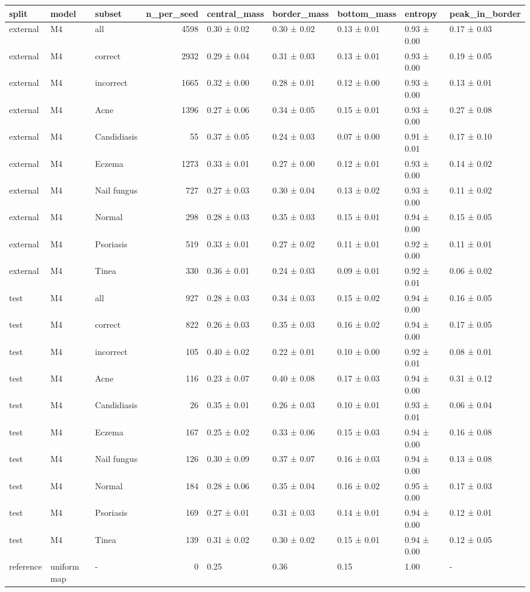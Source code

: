 \begin{tabular}{lllrlllll}
\toprule
split & model & subset & n\_per\_seed & central\_mass & border\_mass & bottom\_mass & entropy & peak\_in\_border \\
\midrule
external & M4 & all & 4598 & 0.30 ± 0.02 & 0.30 ± 0.02 & 0.13 ± 0.01 & 0.93 ± 0.00 & 0.17 ± 0.03 \\
external & M4 & correct & 2932 & 0.29 ± 0.04 & 0.31 ± 0.03 & 0.13 ± 0.01 & 0.93 ± 0.00 & 0.19 ± 0.05 \\
external & M4 & incorrect & 1665 & 0.32 ± 0.00 & 0.28 ± 0.01 & 0.12 ± 0.00 & 0.93 ± 0.00 & 0.13 ± 0.01 \\
external & M4 & Acne & 1396 & 0.27 ± 0.06 & 0.34 ± 0.05 & 0.15 ± 0.01 & 0.93 ± 0.00 & 0.27 ± 0.08 \\
external & M4 & Candidiasis & 55 & 0.37 ± 0.05 & 0.24 ± 0.03 & 0.07 ± 0.00 & 0.91 ± 0.01 & 0.17 ± 0.10 \\
external & M4 & Eczema & 1273 & 0.33 ± 0.01 & 0.27 ± 0.00 & 0.12 ± 0.01 & 0.93 ± 0.00 & 0.14 ± 0.02 \\
external & M4 & Nail fungus & 727 & 0.27 ± 0.03 & 0.30 ± 0.04 & 0.13 ± 0.02 & 0.93 ± 0.00 & 0.11 ± 0.02 \\
external & M4 & Normal & 298 & 0.28 ± 0.03 & 0.35 ± 0.03 & 0.15 ± 0.01 & 0.94 ± 0.00 & 0.15 ± 0.05 \\
external & M4 & Psoriasis & 519 & 0.33 ± 0.01 & 0.27 ± 0.02 & 0.11 ± 0.01 & 0.92 ± 0.00 & 0.11 ± 0.01 \\
external & M4 & Tinea & 330 & 0.36 ± 0.01 & 0.24 ± 0.03 & 0.09 ± 0.01 & 0.92 ± 0.01 & 0.06 ± 0.02 \\
test & M4 & all & 927 & 0.28 ± 0.03 & 0.34 ± 0.03 & 0.15 ± 0.02 & 0.94 ± 0.00 & 0.16 ± 0.05 \\
test & M4 & correct & 822 & 0.26 ± 0.03 & 0.35 ± 0.03 & 0.16 ± 0.02 & 0.94 ± 0.00 & 0.17 ± 0.05 \\
test & M4 & incorrect & 105 & 0.40 ± 0.02 & 0.22 ± 0.01 & 0.10 ± 0.00 & 0.92 ± 0.01 & 0.08 ± 0.01 \\
test & M4 & Acne & 116 & 0.23 ± 0.07 & 0.40 ± 0.08 & 0.17 ± 0.03 & 0.94 ± 0.00 & 0.31 ± 0.12 \\
test & M4 & Candidiasis & 26 & 0.35 ± 0.01 & 0.26 ± 0.03 & 0.10 ± 0.01 & 0.93 ± 0.01 & 0.06 ± 0.04 \\
test & M4 & Eczema & 167 & 0.25 ± 0.02 & 0.33 ± 0.06 & 0.15 ± 0.03 & 0.94 ± 0.00 & 0.16 ± 0.08 \\
test & M4 & Nail fungus & 126 & 0.30 ± 0.09 & 0.37 ± 0.07 & 0.16 ± 0.03 & 0.94 ± 0.00 & 0.13 ± 0.08 \\
test & M4 & Normal & 184 & 0.28 ± 0.06 & 0.35 ± 0.04 & 0.16 ± 0.02 & 0.95 ± 0.00 & 0.17 ± 0.03 \\
test & M4 & Psoriasis & 169 & 0.27 ± 0.01 & 0.31 ± 0.03 & 0.14 ± 0.01 & 0.94 ± 0.00 & 0.12 ± 0.01 \\
test & M4 & Tinea & 139 & 0.31 ± 0.02 & 0.30 ± 0.02 & 0.15 ± 0.01 & 0.94 ± 0.00 & 0.12 ± 0.05 \\
reference & uniform map & - & 0 & 0.25 & 0.36 & 0.15 & 1.00 & - \\
\bottomrule
\end{tabular}
